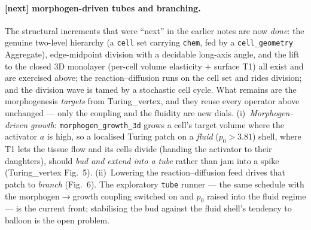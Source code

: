 \documentclass[11pt]{article}
\begin{document}
\paragraph{[next] morphogen-driven tubes and branching.}
The structural increments that were ``next'' in the earlier notes are now \emph{done}: the genuine
two-level hierarchy (a \texttt{cell} set carrying \texttt{chem}, fed by a \texttt{cell\_geometry}
Aggregate), edge-midpoint division with a decidable long-axis angle, and the lift to the closed 3D
monolayer (per-cell volume elasticity $+$ surface T1) all exist and are exercised above; the
reaction--diffusion runs on the cell set and rides division; and the division wave is tamed by a
stochastic cell cycle. What remains are the morphogenesis \emph{targets} from Turing\_vertex, and they
reuse every operator above unchanged --- only the coupling and the fluidity are new dials.
(i)~\emph{Morphogen-driven growth}: \texttt{morphogen\_growth\_3d} grows a cell's target volume where
the activator $a$ is high, so a localised Turing patch on a \emph{fluid} ($p_0\!>\!3.81$) shell, where
T1 lets the tissue flow and its cells divide (handing the activator to their daughters), should
\emph{bud and extend into a tube} rather than jam into a spike (Turing\_vertex Fig.~5). (ii)~Lowering
the reaction--diffusion feed drives that patch to \emph{branch} (Fig.~6). The exploratory \texttt{tube}
runner --- the same schedule with the morphogen$\to$growth coupling switched on and $p_0$ raised into
the fluid regime --- is the current front; stabilising the bud against the fluid shell's tendency to
balloon is the open problem.
\end{document}
